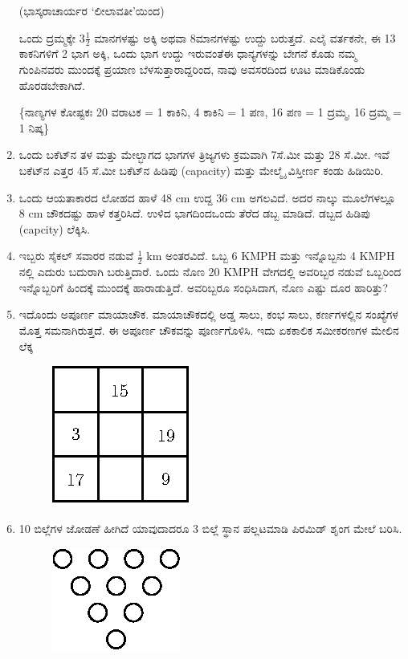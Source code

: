 \begin{enumerate}
\smallskip

\hfill{(ಭಾಸ್ಕರಾಚಾರ್ಯರ `ಲೀಲಾವತೀ'ಯಿಂದ)}

\smallskip

ಒಂದು ದ್ರಮ್ಮಕ್ಕೇ $3\frac{1}{2}$ ಮಾನಗಳಷ್ಟು ಅಕ್ಕಿ ಅಥವಾ 8ಮಾನಗಳಷ್ಟು ಉದ್ದು ಬರುತ್ತದೆ. ಎಲೈ ವರ್ತಕನೇ, ಈ 13 ಕಾಕನಿಗಳಿಗೆ 2 ಭಾಗ ಅಕ್ಕಿ, ಒಂದು ಭಾಗ ಉದ್ದು ಇರುವಂತೆ\break ಈ ಧಾನ್ಯಗಳನ್ನು ಬೇಗನೆ ಕೊಡು ನಮ್ಮ ಗುಂಪಿನವರು ಮುಂದಕ್ಕೆ ಪ್ರಯಾಣ ಬೆಳಸು\break ತ್ತಾರಾದ್ದರಿಂದ, ನಾವು ಅವಸರದಿಂದ ಊಟ ಮಾಡಿಕೊಂಡು ಹೊರಡಬೇಕಾಗಿದೆ. 

\{ನಾಣ್ಯಗಳ ಕೋಷ್ಟಕಃ 20 ವರಾಟಕ = 1 ಕಾಕಿನಿ, 4 ಕಾಕಿನಿ  = 1 ಪಣ, 16 ಪಣ = 1 ದ್ರಮ್ಮ, 16 ದ್ರಮ್ಮ  = 1 ನಿಷ್ಕ\}  

\item ಒಂದು ಬಕೆಟ್‌ನ ತಳ ಮತ್ತು ಮೇಲ್ಭಾಗದ ಭಾಗಗಳ ತ್ರಿಜ್ಯಗಳು ಕ್ರಮವಾಗಿ 7ಸೆ.ಮೀ ಮತ್ತು 28 ಸೆ.ಮೀ. ಇವೆ ಬಕೆಟ್‌ನ ಎತ್ತರ 45 ಸೆ.ಮೀ ಬಕೆಟ್‌ನ ಹಿಡಿಪು (capacity) ಮತ್ತು ಮೇಲ್ಮೈ ವಿಸ್ತೀರ್ಣ ಕಂಡು ಹಿಡಿಯಿರಿ. 

\item ಒಂದು ಆಯತಾಕಾರದ ಲೋಹದ ಹಾಳೆ 48 cm ಉದ್ದ 36 cm ಅಗಲವಿದೆ. ಅದರ ನಾಲ್ಕು ಮೂಲೆಗಳಲ್ಲೂ 8 cm ಚೌಕದಷ್ಟು ಹಾಳೆ ಕತ್ತರಿಸಿದೆ. ಉಳಿದ ಭಾಗದಿಂದ\break ಒಂದು ತೆರೆದ ಡಬ್ಬ ಮಾಡಿದೆ. ಡಬ್ಬದ ಹಿಡಿಪು (capcity) ಲೆಕ್ಕಿಸಿ. 

\item ಇಬ್ಬರು ಸೈಕಲ್ ಸವಾರರ ನಡುವೆ $\frac{1}{2}$ km ಅಂತರವಿದೆ. ಒಬ್ಬ 6 KMPH ಮತ್ತು ಇನ್ನೊಬ್ಬನು 4 KMPH ನಲ್ಲಿ ಎದುರು ಬದುರಾಗಿ ಬರುತ್ತಿದಾರೆ. ಒಂದು ನೊಣ 20 KMPH ವೇಗದಲ್ಲಿ ಅವರಿಬ್ಬರ ನಡುವೆ ಒಬ್ಬರಿಂದ ಇನ್ನೊಬ್ಬರಿಗೆ ಹಿಂದಕ್ಕೆ ಮುಂದಕ್ಕೆ ಹಾರಾಡುತ್ತಿದೆ. ಅವರಿಬ್ಬರೂ ಸಂಧಿಸಿದಾಗ, ನೊಣ ಎಷ್ಟು ದೂರ ಹಾರಿತ್ತು? 

\eject

\item ಇದೊಂದು ಅಪೂರ್ಣ ಮಾಯಾಚೌಕ. ಮಾಯಾಚೌಕದಲ್ಲಿ ಅಡ್ಡ ಸಾಲು, ಕಂಭ ಸಾಲು, ಕರ್ಣಗಳಲ್ಲಿನ ಸಂಖ್ಯೆಗಳ ಮೊತ್ತ ಸಮನಾಗಿರುತ್ತದೆ. ಈ ಅಪೂರ್ಣ ಚೌಕವನ್ನು ಪೂರ್ಣಗೊಳಿಸಿ. ಇದು ಏಕಕಾಲಿಕ ಸಮೀಕರಣಗಳ ಮೇಲಿನ ಲೆಕ್ಕ 
\begin{figure}[H]
\centering
\includegraphics[scale=1.2]{images/chap10/q26.eps}
\end{figure}
 
\item 10 ಬಿಲ್ಲೆಗಳ ಜೋಡಣೆ ಹೀಗಿದೆ ಯಾವುದಾದರೂ 3 ಬಿಲ್ಲೆ ಸ್ಥಾನ ಪಲ್ಲಟಮಾಡಿ ಪಿರಮಿಡ್ ಶೃಂಗ ಮೇಲೆ ಬರಿಸಿ. 
\begin{figure}[H]
\centering
\includegraphics[scale=1.2]{images/chap10/q27.eps}
\end{figure}


\end{enumerate}
